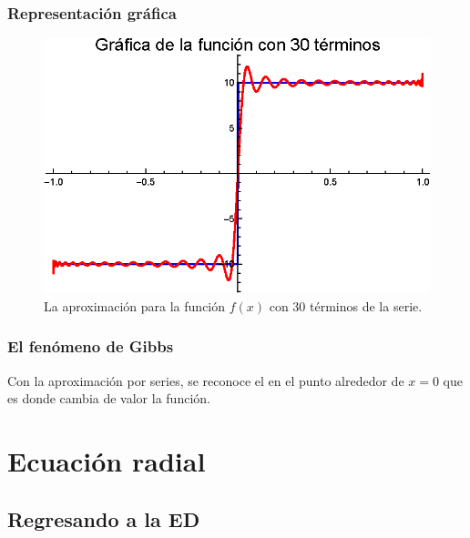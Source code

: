 \documentclass[12pt]{beamer}
\begin{document}
\begin{frame}
\frametitle{Representación gráfica}
\begin{figure}[H]
    \centering
    \includegraphics[scale=1]{Imagenes/Expansion_Legendre_V_30.eps}
    \caption{La aproximación para la función $f (x)$ con 30 términos de la serie.}
    \label{fig:figura_plot_03}
\end{figure}
\end{frame}
\begin{frame}
\frametitle{El fenómeno de Gibbs}
Con la aproximación por series, se reconoce el  en el punto alrededor de $x = 0$ que es donde cambia de valor la función.
\end{frame}

\section{Ecuación radial}
\subsection{Regresando a la ED}
\end{document}
